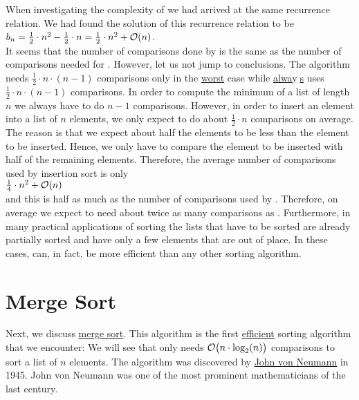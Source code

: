 When investigating the complexity of  we had arrived at the same recurrence
relation. We had found the solution of this recurrence relation to be
\\[0.2cm]
\hspace*{1.3cm} $b_n = \frac{1}{2} \cdot n^2 - \frac{1}{2}\cdot n = \frac{1}{2} \cdot n^2 +
\mathcal{O}(n)$. 
\\[0.2cm]
It seems that the number of comparisons done by  is the same as the number of
comparisons needed for .  However, let us not jump to conclusions.
The algorithm  needs
$\frac{1}{2}\cdot n \cdot (n-1)$ comparisons only in the \underline{worst} case while 
\underline{alwa}y$\!\!$\underline{$\;$s} uses $\frac{1}{2} \cdot n\cdot(n-1)$ comparisons.
In order to compute the minimum of a list of length $n$ we always have to do $n-1$ comparisons.
However, in order to insert an element into a list of $n$ elements, we only expect to do about
$\frac{1}{2} \cdot n$ comparisons on average.  The reason is that we expect about half the elements  to
be less than the element to be inserted.  Hence, we only have to compare the element to be inserted
with half of the remaining elements.  Therefore, the average number of comparisons used by
insertion sort is only
\\[0.2cm]
\hspace*{1.3cm}
 $\frac{1}{4} \cdot n^2 + \mathcal{O}(n)$
\\[0.2cm]
and this is half as much as the number of comparisons used by .  Therefore, on
average we expect  to need about twice as many comparisons as .
Furthermore,  in many practical applications of sorting the lists that have to be sorted are already
partially sorted and have only a few elements that are out of place.  In these cases,
 can, in fact, be more efficient than any other sorting algorithm.


\section{Merge Sort}
Next, we discuss \href{http://en.wikipedia.org/wiki/Merge_sort}{merge sort}.  This algorithm
is the first \underline{efficient} sorting algorithm that we encounter: We will see that  
only needs $\mathcal{O}\bigl(n \cdot \log_2(n)\bigr)$ comparisons to sort a list of $n$ elements.  
The  algorithm was discovered by
\href{http://en.wikipedia.org/wiki/John_von_Neumann}{John von Neumann} in 1945.  John von Neumann 
was one of the most prominent mathematicians of the last century.  

